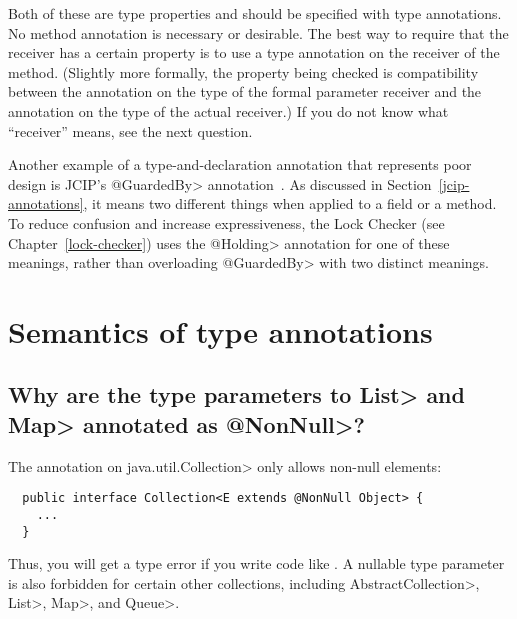 Both of these are type properties and should be specified with type
annotations.  No method annotation is necessary or desirable.  The best way
to require that the receiver has a certain property is to use a type
annotation on the receiver of the method.  (Slightly more formally, the
property being checked is compatibility between the annotation on the type
of the formal parameter receiver and the annotation on the type of the
actual receiver.)  If you do not know what ``receiver'' means, see the next
question.


Another example of a type-and-declaration annotation that represents poor
design is JCIP's \<@GuardedBy> annotation~\cite{Goetz2006}.  As discussed
in Section~\ref{jcip-annotations}, it means two different things when
applied to a field or a method.  To reduce confusion and increase
expressiveness, the Lock Checker (see Chapter~\ref{lock-checker}) uses the
\<@Holding> annotation for one of these meanings, rather than overloading
\<@GuardedBy> with two distinct meanings.


\section{Semantics of type annotations\label{faq-semantics-section}}


\subsection{Why are the type parameters to \<List> and \<Map> annotated as \<@NonNull>?\label{faq-list-map-nonnull-typeargs}}

The annotation on \<java.util.Collection> only allows non-null elements:

\begin{Verbatim}
  public interface Collection<E extends @NonNull Object> {
    ...
  }
\end{Verbatim}

\noindent
Thus, you will get a type error if you write code like
.
A nullable
type parameter is also forbidden for certain other collections, including
\<AbstractCollection>, \<List>, \<Map>, and \<Queue>.



